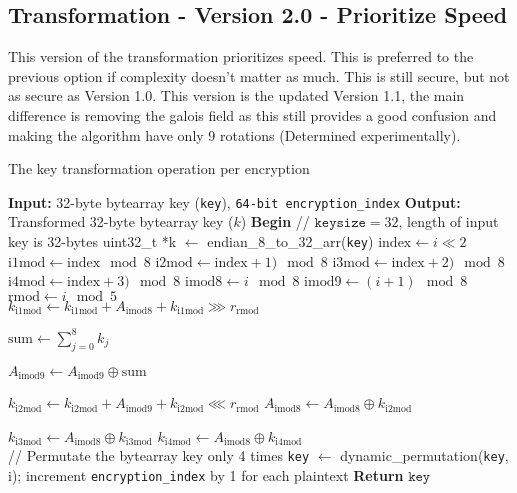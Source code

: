 \documentclass[fleqn, a4paper,12pt]{article}
\newcommand{\COMMENT}[1]{\State \textcolor[HTML]{003e57}{// #1}}
\begin{document}
\subsection{Transformation - Version 2.0 - Prioritize Speed}

This version of the transformation prioritizes speed. This is preferred to the previous option if complexity doesn't matter as much. This is still secure, but not as secure as Version 1.0. This version is the updated Version 1.1, the main difference is removing the galois field as this still provides a good confusion and making the algorithm have only 9 rotations (Determined experimentally).

\begin{algorithm}[H] %
\caption{The key transformation operation per encryption}
\begin{algorithmic}[1]  %
\State \textbf{Input:} 32-byte bytearray key (\texttt{key}), \texttt{64-bit encryption\_index}
\State \textbf{Output:} Transformed 32-byte bytearray key ($k$)
\State \textbf{Begin}
\COMMENT{$\texttt{keysize} = 32$, length of input key is 32-bytes}
\State uint32\_t *k $\gets$ endian\_8\_to\_32\_arr(\texttt{key})
	\State $\mathrm{index} \gets i \ll 2$
	\State $\mathrm{i1mod} \gets \mathrm{index} \mod 8$
	\State $\mathrm{i2mod} \gets \mathrm{index}+1) \mod 8$
	\State $\mathrm{i3mod} \gets \mathrm{index}+2) \mod 8$
	\State $\mathrm{i4mod} \gets \mathrm{index}+3) \mod 8$
	\State $\mathrm{imod8} \gets i \mod 8$
	\State $\mathrm{imod9} \gets (i+1) \mod 8$
	\State $\mathrm{rmod} \gets i \mod 5$ \\
	
	\State $k_\mathrm{i1mod} \gets k_\mathrm{i1mod} + A_\mathrm{imod8} + k_\mathrm{i1mod} \ggg r_\mathrm{rmod}$

	\State $ \mathrm{sum} \gets \displaystyle \sum_{j=0}^8 k_j$

	\State $A_\mathrm{imod9} \gets A_\mathrm{imod9} \oplus \mathrm{sum}$

	\State $k_\mathrm{i2mod} \gets k_\mathrm{i2mod} + A_\mathrm{imod9} + k_\mathrm{i2mod} \lll r_\mathrm{rmod}$
	\State $A_\mathrm{imod8} \gets A_\mathrm{imod8} \oplus k_\mathrm{i2mod}$

	\State $k_\mathrm{i3mod} \gets A_\mathrm{imod8} \oplus k_\mathrm{i3mod}$
	\State $k_\mathrm{i4mod} \gets A_\mathrm{imod8} \oplus k_\mathrm{i4mod}$ \\

	\COMMENT{Permutate the bytearray key only 4 times}
		\State \texttt{key} $\gets$ dynamic\_permutation(\texttt{key}, i);
	\EndIf
\EndFor
\State increment \texttt{encryption\_index} by 1 for each plaintext
\State \textbf{Return} $\texttt{key}$
\end{algorithmic}
\end{algorithm}
\end{document}
